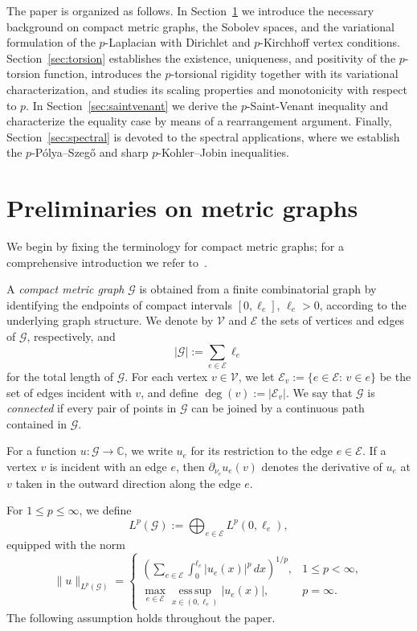 \documentclass[12pt,a4paper]{article}
\numberwithin{equation}{section}
\begin{document}
The paper is organized as follows. In
Section~\ref{sec:setup} we introduce the necessary background on compact
metric graphs, the Sobolev spaces, and
the variational formulation of the $p$-Laplacian with Dirichlet and
$p$-Kirchhoff vertex conditions. Section~\ref{sec:torsion} establishes
the existence, uniqueness, and positivity of the $p$-torsion function,
introduces the $p$-torsional rigidity together with its variational
characterization, and studies its scaling properties and monotonicity
with respect to $p$. In
Section~\ref{sec:saintvenant} we derive the $p$-Saint-Venant inequality
and characterize the equality case by means of a rearrangement
argument. Finally, Section~\ref{sec:spectral} is devoted to the spectral
applications, where we establish the $p$-P\'olya--Szeg\H{o} and sharp
$p$-Kohler--Jobin inequalities.
\section{Preliminaries on metric graphs}
\label{sec:setup}

We begin by fixing the terminology for compact metric graphs; for a
comprehensive introduction we refer to~\cite{BK}.

A \emph{compact metric graph} $\mathcal G$ is obtained from a finite
combinatorial graph by identifying the endpoints of compact intervals
$[0,\ell_e]$, $\ell_e>0$, according to the underlying graph structure.
We denote by $\mathcal{V}$ and $\mathcal{E}$ the sets of vertices and edges of
$\mathcal G$, respectively, and
\[
|\mathcal G|:=\sum_{e\in \mathcal{E}}\ell_e
\]
for the total length of $\mathcal G$.
For each vertex $v\in \mathcal{V}$, we let
\(
\mathcal{E}_v:=\{e\in \mathcal{E}:\,v\in e\}
\)
be the set of edges incident with $v$, and define
$\deg(v):=|\mathcal{E}_v|$. We say that $\mathcal G$ is \emph{connected} if
every pair of points in $\mathcal G$ can be joined by a continuous path
contained in $\mathcal G$.

For a function $u:\mathcal G\to\mathbb C$, we write $u_e$ for its restriction
to the edge $e\in\mathcal E$. If a vertex $v$ is incident with an edge $e$,
then
\(
\partial_{\nu_e}u_e(v)
\)
denotes the derivative of $u_e$ at $v$ taken in the outward direction along
the edge $e$.

For $1\le p\le\infty$, we define
\[
L^p(\mathcal G)
:=
\bigoplus_{e\in\mathcal E}L^p(0,\ell_e),
\]
equipped with the norm
\[
\|u\|_{L^p(\mathcal G)}
=
\begin{cases}
	\displaystyle
	\left(
	\sum_{e\in\mathcal E}
	\int_0^{\ell_e}|u_e(x)|^p\,dx
	\right)^{1/p},
	& 1\le p<\infty,\\[1.2em]
	\displaystyle
	\max_{e\in\mathcal E}
	\operatorname*{ess\,sup}_{x\in(0,\ell_e)}
	|u_e(x)|,
	& p=\infty.
\end{cases}
\]
The following assumption holds throughout the paper.
\end{document}
